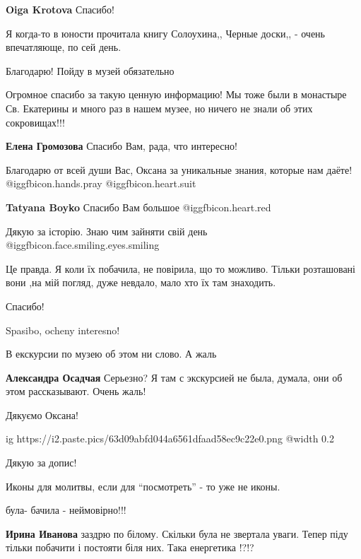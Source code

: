 \begin{itemize}
\textbf{Oiga Krotova} Спасибо!

Я когда-то в юности прочитала книгу Солоухина,, Черные доски,, - очень впечатляюще, по сей день.

Благодарю! Пойду в музей обязательно


Огромное спасибо за такую ценную информацию! Мы тоже были в монастыре Св.
Екатерины и много раз в нашем музее, но ничего не знали об этих сокровищах!!!

\textbf{Елена Громозова} Спасибо Вам, рада, что интересно!


Благодарю от всей души Вас, Оксана за уникальные знания, которые нам даёте!
@igg{fbicon.hands.pray}  @igg{fbicon.heart.suit}

\textbf{Tatyana Boyko} Спасибо Вам большое @igg{fbicon.heart.red}

Дякую за історію.
Знаю чим зайняти свій день  @igg{fbicon.face.smiling.eyes.smiling} 


Це правда. Я коли їх побачила, не повірила, що то можливо. Тільки розташовані
вони ,на мій погляд, дуже невдало, мало хто їх там знаходить.


Спасибо!

Spasibo, ocheny interesno!

В екскурсии по музею об этом ни слово. А жаль

\textbf{Александра Осадчая} Серьезно? Я там с экскурсией не была, думала, они об этом рассказывают. Очень жаль!

Дякуємо Оксана!

\ifcmt
  ig https://i2.paste.pics/63d09abfd044a6561dfaad58ec9c22e0.png
  @width 0.2
\fi

Дякую за допис!

Иконы для молитвы, если для \enquote{посмотреть} - то уже не иконы.

була- бачила - неймовірно!!!

\begin{itemize} %
\textbf{Ирина Иванова} заздрю по білому. Скільки була не звертала уваги. Тепер
піду тільки побачити і постояти біля них. Така енергетика !?!?
\end{itemize} %


\end{itemize}
